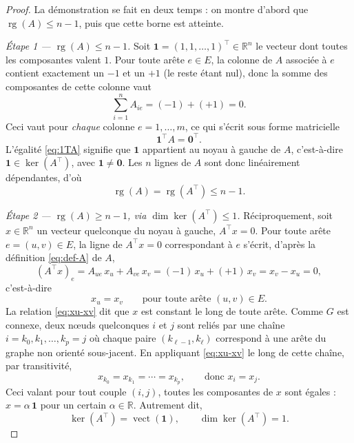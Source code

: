 \documentclass[11pt,a4paper]{article}
\theoremstyle{plain}
\theoremstyle{definition}
\theoremstyle{remark}
\begin{document}
\begin{proof}
La démonstration se fait en deux temps : on montre d'abord que
$\operatorname{rg}(A) \le n - 1$, puis que cette borne est atteinte.

\medskip
\noindent\textit{Étape 1 --- $\operatorname{rg}(A) \le n-1$.}
Soit $\mathbf{1} = (1, 1, \dots, 1)^\top \in \mathbb{R}^n$ le vecteur dont
toutes les composantes valent $1$. Pour toute arête $e \in E$, la colonne
de $A$ associée à $e$ contient exactement un $-1$ et un $+1$ (le reste
étant nul), donc la somme des composantes de cette colonne vaut
\[
\sum_{i=1}^{n} A_{ie} = (-1) + (+1) = 0.
\]
Ceci vaut pour \emph{chaque} colonne $e = 1, \dots, m$, ce qui s'écrit sous
forme matricielle
\begin{equation}
\mathbf{1}^\top A = \mathbf{0}^\top.
\label{eq:1TA}
\end{equation}
L'égalité \eqref{eq:1TA} signifie que $\mathbf{1}$ appartient au noyau à
gauche de $A$, c'est-à-dire $\mathbf{1} \in \ker(A^\top)$, avec
$\mathbf{1} \ne \mathbf{0}$. Les $n$ lignes de $A$ sont donc linéairement
dépendantes, d'où
\begin{equation}
\operatorname{rg}(A) = \operatorname{rg}(A^\top) \le n - 1.
\label{eq:etape1}
\end{equation}

\medskip
\noindent\textit{Étape 2 --- $\operatorname{rg}(A) \ge n-1$, via
$\dim \ker(A^\top) \le 1$.}
Réciproquement, soit $x \in \mathbb{R}^n$ un vecteur quelconque du noyau à
gauche, $A^\top x = 0$. Pour toute arête $e = (u, v) \in E$, la ligne de
$A^\top x = 0$ correspondant à $e$ s'écrit, d'après la définition
\eqref{eq:def-A} de $A$,
\[
(A^\top x)_e = A_{ue}\, x_u + A_{ve}\, x_v = (-1)\, x_u + (+1)\, x_v = x_v - x_u = 0,
\]
c'est-à-dire
\begin{equation}
x_u = x_v \qquad \text{pour toute arête } (u,v) \in E.
\label{eq:xu-xv}
\end{equation}
La relation \eqref{eq:xu-xv} dit que $x$ est constant le long de toute
arête. Comme $G$ est connexe, deux nœuds quelconques $i$ et $j$ sont reliés
par une chaîne $i = k_0, k_1, \dots, k_p = j$ où chaque paire
$(k_{\ell-1}, k_\ell)$ correspond à une arête du graphe non orienté sous-jacent.
En appliquant \eqref{eq:xu-xv} le long de cette chaîne, par transitivité,
\[
x_{k_0} = x_{k_1} = \cdots = x_{k_p}, \qquad \text{donc } x_i = x_j.
\]
Ceci valant pour tout couple $(i,j)$, toutes les composantes de $x$ sont
égales : $x = \alpha \, \mathbf{1}$ pour un certain $\alpha \in \mathbb{R}$.
Autrement dit,
\begin{equation}
\ker(A^\top) = \operatorname{vect}(\mathbf{1}), \qquad \dim \ker(A^\top) = 1.
\label{eq:dim-ker-AT}
\end{equation}


\end{proof}
\end{document}
